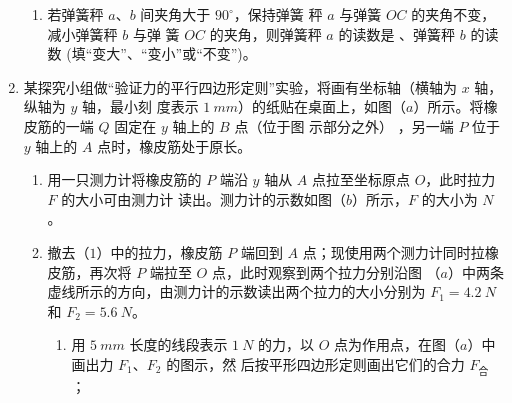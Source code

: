 \begin{enumerate}
\begin{enumerate}
\item 
若弹簧秤 $ a $、$ b $ 间夹角大于 $ 90 ^{ \circ } $，保持弹簧
秤 $ a $ 与弹簧 $ OC $ 的夹角不变，减小弹簧秤 $ b $ 与弹
簧 $ OC $ 的夹角，则弹簧秤 $ a $ 的读数是  、弹簧秤 $ b $ 的读数  (填“变大”、“变小”或“不变”)。

\end{enumerate}



\newpage
\item 
{}
某探究小组做“验证力的平行四边形定则”实验，将画有坐标轴（横轴为 $ x $ 轴，纵轴为 $ y $ 轴，最小刻
度表示 $ 1 \ mm $）的纸贴在桌面上，如图（$ a $）所示。将橡皮筋的一端 $ Q $ 固定在 $ y $ 轴上的 $ B $ 点（位于图
示部分之外）
，另一端 $ P $ 位于 $ y $ 轴上的 $ A $ 点时，橡皮筋处于原长。
\begin{figure}[h!]
\centering

\end{figure}

\begin{enumerate}
\renewcommand{\labelenumi}{\arabic{enumi}.}
\item
用一只测力计将橡皮筋的 $ P $ 端沿 $ y $ 轴从 $ A $ 点拉至坐标原点 $ O $，此时拉力 $ F $ 的大小可由测力计
读出。测力计的示数如图（$ b $）所示，$ F $ 的大小为
$ N $。



\item 
撤去（$ 1 $）中的拉力，橡皮筋 $ P $ 端回到 $ A $
点；现使用两个测力计同时拉橡皮筋，再次将
$ P $ 端拉至 $ O $ 点，此时观察到两个拉力分别沿图
（$ a $）中两条虚线所示的方向，由测力计的示数读出两个拉力的大小分别为 $ F_{1} =4.2 \ N $ 和 $ F_{2} =5.6 \ N $。
\begin{enumerate}
\renewcommand{\labelenumiii}{\roman{enumiii}.}
\item
用 $ 5 \ mm $ 长度的线段表示 $ 1 \ N $ 的力，以 $ O $ 点为作用点，在图（$ a $）中画出力 $ F_{1} $、$ F_{2} $ 的图示，然
后按平形四边形定则画出它们的合力 $ F_{ \text{合} } $ ；


\end{enumerate}
\end{enumerate}
\end{enumerate}

